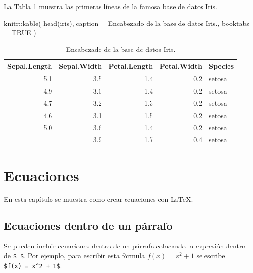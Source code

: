 \documentclass[
]{krantz}
\makeatletter
\newenvironment{Shaded}{\begin{snugshade}}{\end{snugshade}}
\newcommand{\AttributeTok}[1]{\textcolor[rgb]{0.61,0.61,0.61}{#1}}
\newcommand{\ConstantTok}[1]{\textcolor[rgb]{0,0,0}{#1}}
\newcommand{\FunctionTok}[1]{\textcolor[rgb]{0,0,0}{#1}}
\newcommand{\NormalTok}[1]{#1}
\newcommand{\SpecialCharTok}[1]{\textcolor[rgb]{0,0,0}{#1}}
\newcommand{\StringTok}[1]{\textcolor[rgb]{0.5,0.5,0.5}{#1}}
\newenvironment{kframe}{%
\medskip{}
\setlength{\fboxsep}{.8em}
 \def\at@end@of@kframe{}%
 \ifinner\ifhmode%
  \def\at@end@of@kframe{\end{minipage}}%
  \begin{minipage}{\columnwidth}%
 \fi\fi%
 \def\FrameCommand##1{\hskip\@totalleftmargin \hskip-\fboxsep
 \colorbox{shadecolor}{##1}\hskip-\fboxsep
     \hskip-\linewidth \hskip-\@totalleftmargin \hskip\columnwidth}%
 \MakeFramed {\advance\hsize-\width
   \@totalleftmargin\z@ \linewidth\hsize
   \@setminipage}}%
 {\par\unskip\endMakeFramed%
 \at@end@of@kframe}
\renewenvironment{Shaded}{\begin{kframe}}{\end{kframe}}
\makeatother
\begin{document}
La Tabla \ref{tab:iris} muestra las primeras líneas de la famosa base de datos Iris.

\begin{Shaded}
\begin{Highlighting}[]
\NormalTok{knitr}\SpecialCharTok{::}\FunctionTok{kable}\NormalTok{(}
  \FunctionTok{head}\NormalTok{(iris), }\AttributeTok{caption =} \StringTok{\textquotesingle{}Encabezado de la base de datos Iris.\textquotesingle{}}\NormalTok{,}
  \AttributeTok{booktabs =} \ConstantTok{TRUE}
\NormalTok{)}
\end{Highlighting}
\end{Shaded}

\begin{table}

\caption{\label{tab:iris}Encabezado de la base de datos Iris.}
\centering
\begin{tabular}[t]{rrrrl}
\toprule
Sepal.Length & Sepal.Width & Petal.Length & Petal.Width & Species\\
\midrule
5.1 & 3.5 & 1.4 & 0.2 & setosa\\
4.9 & 3.0 & 1.4 & 0.2 & setosa\\
4.7 & 3.2 & 1.3 & 0.2 & setosa\\
4.6 & 3.1 & 1.5 & 0.2 & setosa\\
5.0 & 3.6 & 1.4 & 0.2 & setosa\\
\addlinespace
5.4 & 3.9 & 1.7 & 0.4 & setosa\\
\bottomrule
\end{tabular}
\end{table}

\hypertarget{ecua}{%
\chapter{Ecuaciones}\label{ecua}}

En esta capítulo se muestra como crear ecuaciones con LaTeX.

\hypertarget{ecuaciones-dentro-de-un-puxe1rrafo}{%
\section{Ecuaciones dentro de un párrafo}\label{ecuaciones-dentro-de-un-puxe1rrafo}}

Se pueden incluir ecuaciones dentro de un párrafo colocando la expresión dentro de \texttt{\$\ \$}. Por ejemplo, para escribir esta fórmula \(f(x) = x^2 + 1\) se escribe \texttt{\$f(x)\ =\ x\^{}2\ +\ 1\$}.
\end{document}
